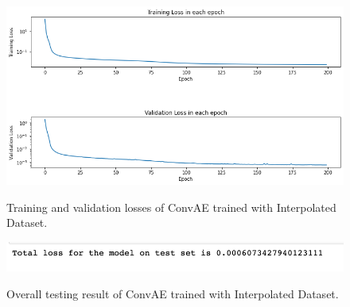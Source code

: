 \begin{figure}[H]
    \caption{Training and validation losses of ConvAE trained with Interpolated Dataset.}
    \includegraphics[scale=0.6]{figures/mantle_convection_images/larger_dataset_interpolated/ConvAE_trainingData.png}
    \label{figure:ConvAE_interpolated_losses}
\end{figure}

\begin{figure}[H]
    \caption{Overall testing result of ConvAE trained with Interpolated Dataset.}
    \includegraphics[scale=0.8]{figures/mantle_convection_images/larger_dataset_interpolated/ConvAE_OverallTesting.png}
    \label{figure:ConvAE_interpolated_testing}
\end{figure}

